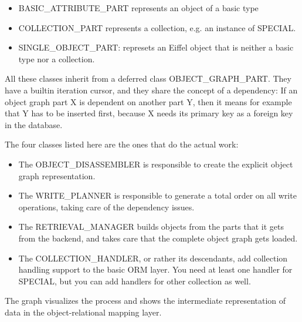 \begin{itemize}
 \item BASIC\_ATTRIBUTE\_PART represents an object of a basic type
 \item COLLECTION\_PART represents a collection, e.g. an instance of SPECIAL.
 \item SINGLE\_OBJECT\_PART: represets an Eiffel object that is neither a basic type nor a collection.
\end{itemize}

All these classes inherit from a deferred class OBJECT\_GRAPH\_PART. 
They have a builtin iteration cursor, and they share the concept of a dependency:
If an object graph part X is dependent on another part Y, then it means for example that Y has to be inserted first, because X needs its primary key as a foreign key in the database.

The four classes listed here are the ones that do the actual work:

\begin{itemize}
 \item The OBJECT\_DISASSEMBLER is responsible to create the explicit object graph representation.
 \item The WRITE\_PLANNER is responsible to generate a total order on all write operations, taking care of the dependency issues.
 \item The RETRIEVAL\_MANAGER builds objects from the parts that it gets from the backend, and takes care that the complete object graph gets loaded.
 \item The COLLECTION\_HANDLER, or rather its descendants, add collection handling support to the basic ORM layer. 
 You need at least one handler for SPECIAL, but you can add handlers for other collection as well.
\end{itemize}

The graph visualizes the process and shows the intermediate representation of data in the object-relational mapping layer.



